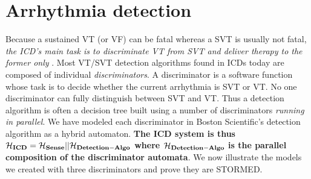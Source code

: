 \section{Arrhythmia detection}
\label{sec:discriminators}
Because a sustained \ac{VT} (or \ac{VF}) can be fatal whereas a \ac{SVT} is usually not fatal, 
\emph{the ICD's main task is to discriminate \ac{VT} from \ac{SVT} and deliver therapy to the former only} \cite{compass}.
Most \ac{VT}/\ac{SVT} detection algorithms found in ICDs today are composed of individual \emph{discriminators}. 
A discriminator is a software function whose task is to decide whether the current arrhythmia is \ac{SVT} or \ac{VT}.
No one discriminator can fully distinguish between SVT and VT.
Thus a detection algorithm is often a decision tree built using a number of discriminators \emph{running in parallel}.
We have modeled each discriminator in Boston Scientific's detection algorithm as a hybrid automaton.
\textbf{The ICD system is thus 
$\mathbf{\mathcal{H}_{ICD} = \mathcal{H}_{Sense}||\mathcal{H}_{Detection-Algo}}$ where $\mathbf{\mathcal{H}_{Detection-Algo}}$ is the parallel composition of the discriminator automata}.
We now illustrate the models we created with three discriminators and prove they are STORMED. 







